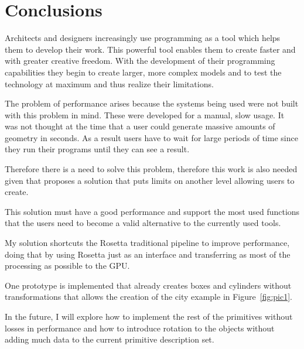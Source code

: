 
% 
% 

\section{Conclusions}
\label{sec:conclusions}

Architects and designers increasingly use programming as a tool which helps them to develop their work. This powerful tool enables them to create faster and with greater creative freedom. With the development of their programming capabilities they begin to create larger, more complex models and to test the technology at maximum and thus realize their limitations.

The problem of performance arises because the systems being used were not built with this problem in mind. These were developed for a manual, slow usage. It was not thought at the time that a user could generate massive amounts of geometry in seconds. As a result users have to wait for large periods of time since they run their programs until they can see a result.

Therefore there is a need to solve this problem, therefore this work is also needed given that proposes a solution that puts limits on another level allowing users to create.

This solution must have a good performance and support the most used functions that the users need to become a valid alternative to the currently used tools.

My solution shortcuts the Rosetta traditional pipeline to improve performance, doing that by using Rosetta just as an interface and transferring as most of the processing as possible to the GPU.

One prototype is implemented that already creates boxes and cylinders without transformations that allows the creation of the city example in Figure~\ref{fig:pic1}.

In the future, I will explore how to implement the rest of the primitives without losses in performance and how to introduce rotation to the objects without adding much data to the current primitive description set.